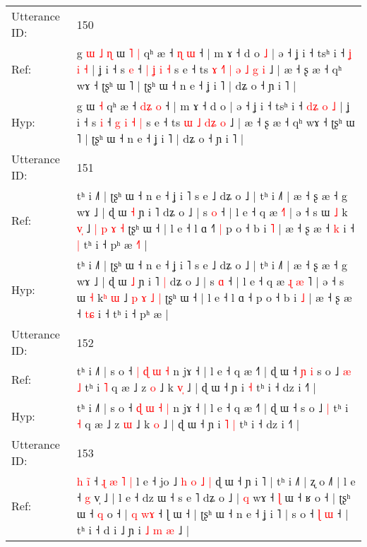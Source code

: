\documentclass[10pt]{article}
\DeclareRobustCommand{\hl}[1]{{\textcolor{red}{#1}}}
\begin{document}
\begin{longtable}{ll}
 \\
\midrule
Utterance ID: & 150 \\
Ref: & g\hl{ }\hl{ɯ}\hl{ }\hl{˩}\hl{ }\hl{ɳ} ɯ\hl{ }\hl{˥} \hl{|} qʰ æ ˧ \hl{}\hl{ɳ} \hl{ɯ} ˧ | m ɤ ˧ d o\hl{ }\hl{˩} | ə ˧ ʝ i ˧ tsʰ i ˧ \hl{}\hl{ʝ} \hl{i} \hl{˧} | ʝ i ˧ s \hl{e} ˧ \hl{|} \hl{ʝ} \hl{i} \hl{˧} s e ˧ ts\hl{ }\hl{ɤ}\hl{ }\hl{˧}\hl{˥} \hl{|} \hl{ə} \hl{˩}\hl{ }\hl{g} \hl{i} ˩ | æ ˧ ʂ æ ˧ qʰ wɤ ˧ ʈʂʰ ɯ ˥ | ʈʂʰ ɯ ˧ n e ˧ ʝ i ˥ | dʑ o ˧ ɲ i ˥ |
 \\
Hyp: & g\hl{}\hl{}\hl{}\hl{}\hl{}\hl{} ɯ\hl{}\hl{} \hl{˧} qʰ æ ˧ \hl{d}\hl{ʑ} \hl{o} ˧ | m ɤ ˧ d o\hl{}\hl{} | ə ˧ ʝ i ˧ tsʰ i ˧ \hl{d}\hl{ʑ} \hl{o} \hl{˩} | ʝ i ˧ s \hl{i} ˧ \hl{g} \hl{i} \hl{˧} \hl{|} s e ˧ ts\hl{}\hl{}\hl{}\hl{}\hl{} \hl{ɯ} \hl{˩} \hl{}\hl{d}\hl{ʑ} \hl{o} ˩ | æ ˧ ʂ æ ˧ qʰ wɤ ˧ ʈʂʰ ɯ ˥ | ʈʂʰ ɯ ˧ n e ˧ ʝ i ˥ | dʑ o ˧ ɲ i ˥ |
 \\
\midrule
Utterance ID: & 151 \\
Ref: & tʰ i ˩˥ | ʈʂʰ ɯ ˧ n e ˧ ʝ i ˥ s e ˩ dʑ o ˩ | tʰ i ˩˥ | æ ˧ ʂ æ ˧ g wɤ ˩ | ɖ ɯ \hl{˧} ɲ i ˥\hl{}\hl{} dʑ o ˩ | s \hl{o} ˧ | l e ˧ q æ\hl{}\hl{} \hl{}\hl{˧}˥ | ə ˧ s ɯ \hl{˩} k\hl{ }\hl{v}\hl{̩} ˩ \hl{|} \hl{p} \hl{ɤ} \hl{˧} ʈʂʰ ɯ ˧ | l e ˧ l ɑ ˧\hl{˥}\hl{ }\hl{|} p o ˧ b i \hl{˥} | æ ˧ ʂ æ ˧ \hl{}\hl{k} i ˧\hl{ }\hl{|} tʰ i ˧ pʰ æ\hl{ }\hl{˧}\hl{˥} |
 \\
Hyp: & tʰ i ˩˥ | ʈʂʰ ɯ ˧ n e ˧ ʝ i ˥ s e ˩ dʑ o ˩ | tʰ i ˩˥ | æ ˧ ʂ æ ˧ g wɤ ˩ | ɖ ɯ \hl{˩} ɲ i ˥\hl{ }\hl{|} dʑ o ˩ | s \hl{ɑ} ˧ | l e ˧ q æ\hl{ }\hl{ɻ} \hl{æ}\hl{ }˥ | ə ˧ s ɯ \hl{˧} k\hl{ʰ}\hl{ }\hl{ɯ} ˩ \hl{p} \hl{ɤ} \hl{˩} \hl{|} ʈʂʰ ɯ ˧ | l e ˧ l ɑ ˧\hl{}\hl{}\hl{} p o ˧ b i \hl{˩} | æ ˧ ʂ æ ˧ \hl{t}\hl{ɕ} i ˧\hl{}\hl{} tʰ i ˧ pʰ æ\hl{}\hl{}\hl{} |
 \\
\midrule
Utterance ID: & 152 \\
Ref: & tʰ i ˩˥ | s o ˧ \hl{|} \hl{ɖ} \hl{ɯ} \hl{˧} n jɤ ˧ | l e ˧ q æ ˧˥ | ɖ ɯ ˧\hl{ }\hl{ɲ}\hl{ }\hl{i} s o ˩\hl{ }\hl{æ} \hl{˩} tʰ i \hl{˥} q æ ˩ z \hl{o} ˩ k \hl{v}\hl{̩} ˩ | ɖ ɯ ˧ ɲ i\hl{}\hl{} \hl{˧} tʰ i ˧ dz i ˧˥ |
 \\
Hyp: & tʰ i ˩˥ | s o ˧ \hl{ɖ} \hl{ɯ} \hl{˧} \hl{|} n jɤ ˧ | l e ˧ q æ ˧˥ | ɖ ɯ ˧\hl{}\hl{}\hl{}\hl{} s o ˩\hl{}\hl{} \hl{|} tʰ i \hl{˧} q æ ˩ z \hl{ɯ} ˩ k \hl{}\hl{o} ˩ | ɖ ɯ ˧ ɲ i\hl{ }\hl{˥} \hl{|} tʰ i ˧ dz i ˧˥ |
 \\
\midrule
Utterance ID: & 153 \\
Ref: & \hl{h} \hl{i}\hl{̃} ˧\hl{ }\hl{ɻ}\hl{ }\hl{æ}\hl{ }\hl{˥}\hl{ }\hl{|} l e ˧ jo ˩ \hl{h} \hl{o} \hl{˩} \hl{|} ɖ ɯ ˧ ɲ i ˥ | tʰ i ˩˥ | ʐ o ˩˥ | l e ˧ \hl{g} v̩ ˩ | l e ˧ dz ɯ ˧ s e ˥ dʑ o ˩ | \hl{q} wɤ ˧\hl{}\hl{} \hl{ɭ} ɯ ˧ ʁ o ˧ | ʈʂʰ ɯ ˧\hl{ }\hl{q} o ˧ | \hl{q} \hl{w}\hl{ɤ} ˧ ɭ ɯ ˧ | ʈʂʰ ɯ ˧ n e ˧ ʝ i ˥ | s o ˧ \hl{ɭ}\hl{ }\hl{ɯ} ˧ | tʰ i ˧ d i ˩ ɲ i\hl{ }\hl{˩}\hl{ }\hl{m}\hl{ }\hl{æ} ˩ |

\end{longtable}
\end{document}
